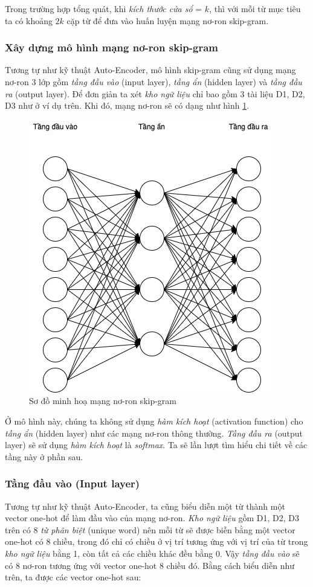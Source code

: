 Trong trường hợp tổng quát, khi \textit{kích thước cửa sổ} = $k$, thì với mỗi từ mục tiêu ta có khoảng $2k$ cặp từ để đưa vào huấn luyện mạng nơ-ron skip-gram.

\subsubsection{Xây dựng mô hình mạng nơ-ron skip-gram}
Tương tự như kỹ thuật Auto-Encoder, mô hình skip-gram cũng sử dụng mạng nơ-ron 3 lớp gồm \textit{tầng đầu vào} (input layer), \textit{tầng ẩn} (hidden layer) và \textit{tầng đầu ra} (output layer). Để đơn giản ta xét \textit{kho ngữ liệu} chỉ bao gồm 3 tài liệu D1, D2, D3 như ở ví dụ trên. Khi đó, mạng nơ-ron sẽ có dạng như hình \ref{fig:skip_gram}.

\begin{figure}[!h]
	\centering
		\includegraphics[width=0.5\columnwidth]{books/artificial-neural-network/chapter04/figure/skip-gram-architecture.jpg}
        \caption{Sơ đồ minh hoạ mạng nơ-ron skip-gram}
        \label{fig:skip_gram}
\end{figure}

Ở mô hình này, chúng ta không sử dụng \textit{hàm kích hoạt} (activation function) cho \textit{tầng ẩn} (hidden layer) như các mạng nơ-ron thông thường. \textit{Tầng đầu ra} (output layer) sẽ sử dụng \textit{hàm kích hoạt} là \textit{softmax}. Ta sẽ lần lượt tìm hiểu chi tiết về các tầng này ở phần sau.

\subsubsection{Tầng đầu vào (Input layer)}
Tương tự như kỹ thuật Auto-Encoder, ta cũng biểu diễn một từ thành một vector one-hot để làm đầu vào của mạng nơ-ron. \textit{Kho ngữ liệu} gồm D1, D2, D3 trên có 8 \textit{từ phân biệt} (unique word) nên mỗi từ sẽ được biễn bằng một vector one-hot có 8 chiều, trong đó chỉ có chiều ở vị trí tương ứng với vị trí của từ trong \textit{kho ngữ liệu} bằng 1, còn tất cả các chiều khác đều bằng 0. Vậy \textit{tầng đầu vào} sẽ có 8 nơ-ron tương ứng với vector one-hot 8 chiều đó. Bằng cách biểu diễn như trên, ta được các vector one-hot sau:

